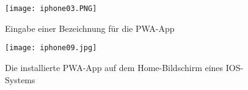  \begin{figure}
    \begin{minipage}[b]{.4\linewidth} %
       \texttt{[image: iphone03.PNG]}
       \caption{Eingabe einer Bezeichnung für die PWA-App}
    \end{minipage}
    \hspace{.1\linewidth}%
    \begin{minipage}[b]{.4\linewidth} %
       \texttt{[image: iphone09.jpg]}
       \caption{Die installierte PWA-App auf dem Home-Bildschirm eines IOS-Systems }
    \end{minipage}
 \end{figure}


 